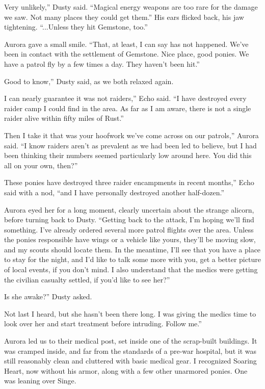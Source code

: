 \leavevmode{}Very unlikely,” Dusty said. “Magical energy weapons are too rare for the damage we saw. Not many places they could get them.” His ears flicked back, his jaw tightening. “...Unless they hit Gemstone, too.”

Aurora gave a small smile. “That, at least, I can say has not happened. We’ve been in contact with the settlement of Gemstone. Nice place, good ponies. We have a patrol fly by a few times a day. They haven’t been hit.”

\leavevmode{}Good to know,” Dusty said, as we both relaxed again.

\leavevmode{}I can nearly guarantee it was not raiders,” Echo said. “I have destroyed every raider camp I could find in the area. As far as I am aware, there is not a single raider alive within fifty miles of Rust.”

\leavevmode{}Then I take it that was your hoofwork we’ve come across on our patrols,” Aurora said. “I know raiders aren’t as prevalent as we had been led to believe, but I had been thinking their numbers seemed particularly low around here. You did this all on your own, then?”

\leavevmode{}These ponies have destroyed three raider encampments in recent months,” Echo said with a nod, “and I have personally destroyed another half-dozen.”

Aurora eyed her for a long moment, clearly uncertain about the strange alicorn, before turning back to Dusty. “Getting back to the attack, I’m hoping we’ll find something. I’ve already ordered several more patrol flights over the area. Unless the ponies responsible have wings or a vehicle like yours, they’ll be moving slow, and my scouts should locate them. In the meantime, I’ll see that you have a place to stay for the night, and I’d like to talk some more with you, get a better picture of local events, if you don’t mind. I also understand that the medics were getting the civilian casualty settled, if you’d like to see her?”

\leavevmode{}Is she awake?” Dusty asked.

\leavevmode{}Not last I heard, but she hasn’t been there long. I was giving the medics time to look over her and start treatment before intruding. Follow me.”

Aurora led us to their medical post, set inside one of the scrap-built buildings. It was cramped inside, and far from the standards of a pre-war hospital, but it was still reasonably clean and cluttered with basic medical gear. I recognized Soaring Heart, now without his armor, along with a few other unarmored ponies. One was leaning over Singe.

